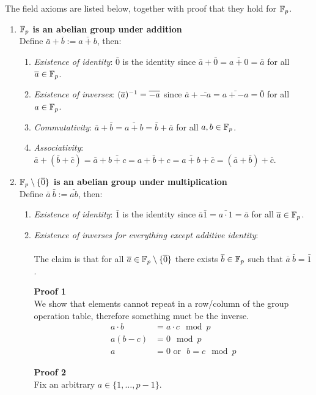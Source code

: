 \documentclass[12pt]{article}
\begin{document}
The field axioms are listed below, together with proof that they hold for $\mathbb{F}_p$.
\begin{enumerate}
\item \textbf{$\mathbb{F}_p$ is an abelian group under addition}\\
  Define $\bar a + \bar b := \bar{a + b}$, then:
  \begin{enumerate}
  \item \textit{Existence of identity}: $\bar 0$ is the identity since
    $\bar a + \bar 0 = \bar{a + 0} = \bar{a}$ for all $\overline a \in \mathbb{F}_p$.
  \item \textit{Existence of inverses}: $(\overline a)^{-1} = \overline{-a}$ since
    $\bar a + \bar{-a} = \bar{a + -a} = \bar{0}$ for all $a \in \mathbb{F}_p$.
  \item \textit{Commutativity}:
    $\bar a + \bar b = \bar{a + b} = \bar{b} + \bar{a}$ for all $a, b \in \mathbb{F}_p$.
  \item \textit{Associativity}:
    $\bar a + (\bar b + \bar c) = \bar a + \bar {b + c} = \bar{a + b + c} =
    \bar{a + b} + \bar{c} = (\bar a + \bar b) + \bar{c}$.
  \end{enumerate}
\item \textbf{$\mathbb{F}_p\setminus\{\overline 0\}$ is an abelian group under multiplication}\\
  Define $\bar a ~ \bar b := \bar{ab}$, then:
  \begin{enumerate}
  \item \textit{Existence of identity}: $\bar 1$ is the identity since
    $\bar a \bar 1 = \bar{a\cdot 1} = \bar{a}$ for all $\overline a \in \mathbb{F}_p$.
    \newpage
  \item \textit{Existence of inverses for everything except additive identity}:\\\\
    The claim is that for all $\overline a \in \mathbb{F}_p \setminus \{\overline 0\}$ there
    exists $\overline b \in \mathbb{F}_p$ such that $\bar a ~ \bar b = \bar 1$.

    \textbf{Proof 1}\\
    We show that elements cannot repeat in a row/column of the group operation
    table, therefore something muct be the inverse.
    \begin{align*}
      a \cdot b &= a \cdot c \mod p\\
      a(b - c) &= 0 \mod p\\
      a &= 0 \text{~or~~} b = c \mod p
    \end{align*}

    \textbf{Proof 2}\\
    Fix an arbitrary $a \in \{1, \ldots, p-1\}$.


\end{enumerate}
\end{enumerate}
\end{document}
